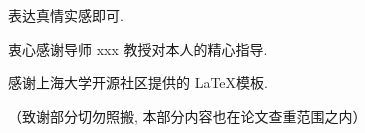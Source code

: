 \begin{acknowledgement}

    表达真情实感即可. 

    衷心感谢导师 xxx 教授对本人的精心指导. 
  
    感谢上海大学开源社区提供的 \LaTeX 模板. 

    （致谢部分切勿照搬, 本部分内容也在论文查重范围之内）


\end{acknowledgement}
